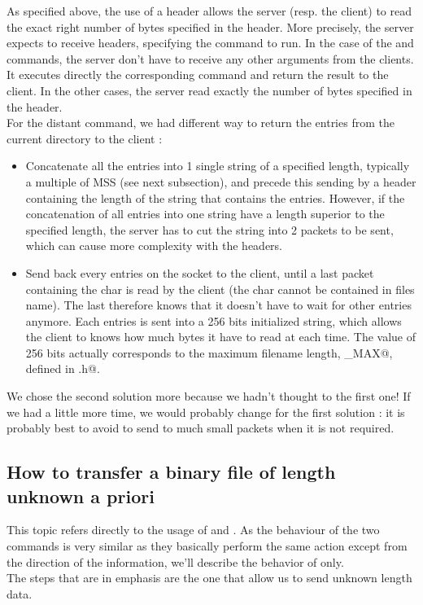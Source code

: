 \documentclass{article}
\begin{document}
As specified above, the use of a header allows the server (resp. the client) to read the exact right number of bytes specified in the header. More precisely, the server expects to receive headers, specifying the command to run. In the case of the \verb@PWD@ and \verb@LS@ commands, the server don't have to receive any other arguments from the clients. It executes directly the corresponding command and return the result to the client. In the other cases, the server read exactly the number of bytes specified in the header.\\

For the distant \verb@LS@ command, we had different way to return the entries from the current directory to the client : 
\begin{itemize}
\item Concatenate all the entries into 1 single string of a specified length, typically a multiple of MSS (see next subsection), and precede this sending by a header containing the length of the string that contains the entries. However, if the concatenation of all entries into one string have a length superior to the specified length, the server has to cut the string into 2 packets to be sent, which can cause more complexity with the headers.
\item Send back every entries on the socket to the client, until a last packet containing the char \verb@\n@ is read by the client (the char \verb@\n@ cannot be contained in files name). The last therefore knows that it doesn't have to wait for other entries anymore. Each entries is sent into a 256 bits initialized string, which allows the client to knows how much bytes it have to read at each time. The value of 256 bits actually corresponds to the maximum filename length, \verb@NAME_MAX@, defined in \verb@limits.h@.
\end{itemize}

We chose the second solution more because we hadn't thought to the first one! If we had a little more time, we would probably change for the first solution : it is probably best to avoid to send to much small packets when it is not required.

\subsection{How to transfer a binary file of length unknown a priori}
\label{put_get}
This topic refers directly to the usage of \verb@GET@ and \verb@PUT@. As the behaviour of the two commands is very similar as they basically perform the same action except from the direction of the information, we'll describe the behavior of \verb@PUT@ only. \\
The steps that are in emphasis are the one that allow us to send unknown length data.\\
\end{document}
